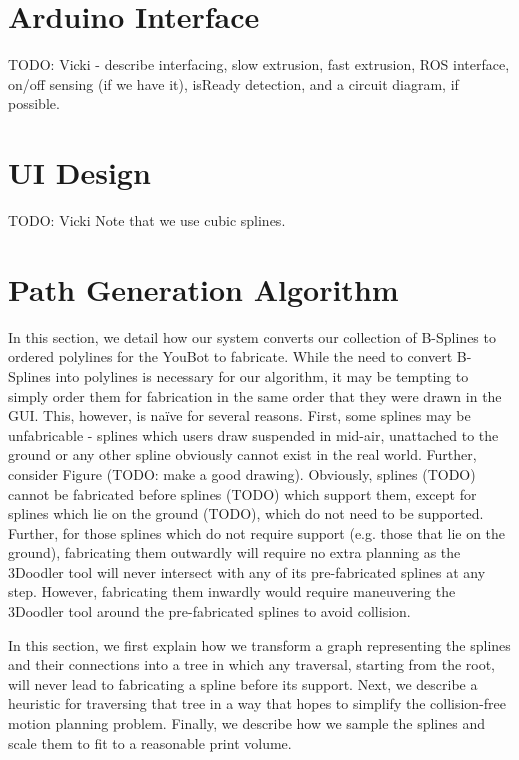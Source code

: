 \documentclass[conference]{acmsiggraph}
\begin{document}

\section{Arduino Interface}
TODO: Vicki - describe interfacing, slow extrusion, fast extrusion, ROS interface, on/off sensing (if we have it), isReady detection, and a circuit diagram, if possible.


\section{UI Design}
TODO: Vicki
Note that we use cubic splines.

\section{Path Generation Algorithm}
In this section, we detail how our system converts our collection of B-Splines to ordered polylines for the YouBot to fabricate.  While the need to convert B-Splines into polylines is necessary for our algorithm, it may be tempting to simply order them for fabrication in the same order that they were drawn in the GUI.  This, however, is naïve for several reasons.  First, some splines may be unfabricable - splines which users draw suspended in mid-air, unattached to the ground or any other spline obviously cannot exist in the real world.  Further, consider Figure (TODO: make a good drawing).  Obviously, splines (TODO) cannot be fabricated before splines (TODO) which support them, except for splines which lie on the ground (TODO), which do not need to be supported.  Further, for those splines which do not require support (e.g. those that lie on the ground), fabricating them outwardly will require no extra planning as the 3Doodler tool will never intersect with any of its pre-fabricated splines at any step.  However, fabricating them inwardly would require maneuvering the 3Doodler tool around the pre-fabricated splines to avoid collision.

In this section, we first explain how we transform a graph representing the splines and their connections into a tree in which any traversal, starting from the root, will never lead to fabricating a spline before its support.  Next, we describe a heuristic for traversing that tree in a way that hopes to simplify the collision-free motion planning problem.  Finally, we describe how we sample the splines and scale them to fit to a reasonable print volume.
\end{document}
